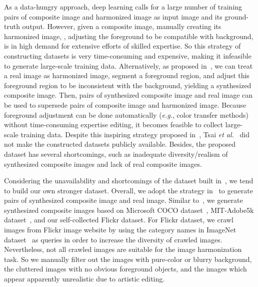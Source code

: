 \documentclass[10pt,twocolumn,letterpaper]{article}
\begin{document}
As a data-hungry approach, deep learning calls for a large number of training pairs of composite image and harmonized image as input image and its ground-truth output. However, given a composite image, manually creating its harmonized image, \ie, adjusting the foreground to be compatible with background, is in high demand for extensive efforts of skilled expertise. So this strategy of constructing datasets is very time-consuming and expensive, making it infeasible to generate large-scale training data. Alternatively, as proposed in~\cite{tsai2017deep}, we can treat a real image as harmonized image, segment a foreground region, and adjust this foreground region to be inconsistent with the background, yielding a synthesized composite image. Then, pairs of synthesized composite image and real image can be used to supersede pairs of composite image and harmonized image. Because foreground adjustment can be done automatically (\emph{e.g.}, color transfer methods) without time-consuming expertise editing, it becomes feasible to collect large-scale training data. Despite this inspiring strategy proposed in~\cite{tsai2017deep}, Tsai \emph{et al.}~\cite{tsai2017deep} did not make the constructed datasets publicly available. Besides, the proposed dataset has several shortcomings, such as inadequate diversity/realism of synthesized composite images and lack of real composite images.

Considering the unavailability and shortcomings of the dataset built in~\cite{tsai2017deep}, we tend to build our own stronger dataset. Overall, we adopt the strategy in~\cite{tsai2017deep} to generate pairs of synthesized composite image and real image. Similar to~\cite{tsai2017deep}, we generate synthesized composite images based on Microsoft COCO dataset~\cite{lin2014microsoft}, MIT-Adobe5k dataset~\cite{bychkovsky2011learning}, and our self-collected Flickr dataset. For Flickr dataset, we crawl images from Flickr image website by using the category names in ImageNet dataset~\cite{imagenet_cvpr09} as queries in order to increase the diversity of crawled images. Nevertheless, not all crawled images are suitable for the image harmonization task. So we manually filter out the images with pure-color or blurry background, the cluttered images with no obvious foreground objects, and the images which appear apparently unrealistic due to artistic editing.
\end{document}
